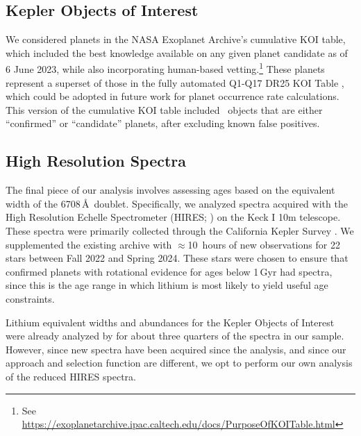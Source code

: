 \documentclass[11pt,twocolumn,tighten]{aastex63}
\newcommand{\nkoiswithprot}{{$\sim$2{,}000}}
\newcommand{\nkoisnofpwithprot}{{$\sim$1{,}000}}
\begin{document}
\subsection{Kepler Objects of Interest}
\label{subsec:planetsel}

We considered planets in the NASA Exoplanet Archive's cumulative KOI
table, which included the best knowledge available on any given planet
candidate as of 6 June 2023, while also incorporating human-based
vetting.\footnote{See
\url{https://exoplanetarchive.ipac.caltech.edu/docs/PurposeOfKOITable.html}}
These planets represent a superset of those in the fully automated
Q1-Q17 DR25 KOI Table \citep{Thompson_2018}, which could be adopted in
future work for planet occurrence rate calculations.  This version of
the cumulative KOI table included \nkoisnofp\ objects that are either
``confirmed'' or ``candidate'' planets, after excluding known false
positives. 


\subsection{High Resolution Spectra}
\label{subsec:lithiumsel}

The final piece of our analysis involves assessing ages based on the
equivalent width of the  6708\,\AA\ doublet.  Specifically,
we analyzed spectra acquired with the High Resolution Echelle
Spectrometer (HIRES; \citealt{vogt_hires_1994}) on the Keck I 10m
telescope.  These spectra were primarily collected through the
California Kepler Survey
\citep{2017AJ....154..107P,2017AJ....154..108J,2017AJ....154..109F}.
We supplemented the existing archive with $\approx$10~hours of new
observations for 22 stars between Fall 2022 and Spring 2024.  These
stars were chosen to ensure that confirmed planets with rotational
evidence for ages below 1\,Gyr had spectra, since this is the age
range in which lithium is most likely to yield useful age constraints.

Lithium equivalent widths and abundances for the Kepler Objects of
Interest were already analyzed by \citet{2018ApJ...855..115B} for
about three quarters of the spectra in our sample.  However, since new
spectra have been acquired since the \citeauthor{2018ApJ...855..115B}
analysis, and since our approach and selection function are different,
we opt to perform our own analysis of the reduced HIRES spectra.
\end{document}
